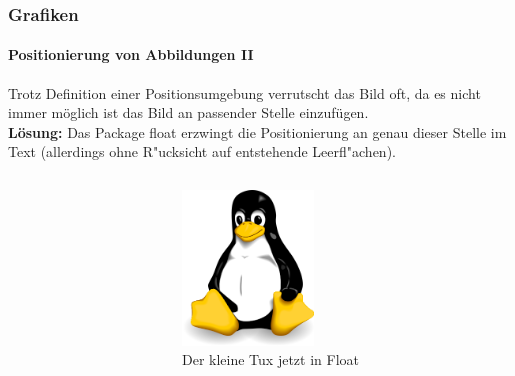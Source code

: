 
\begin{frame}[t]
\medskip
\frametitle{Grafiken}
\framesubtitle{Positionierung von Abbildungen II }
Trotz Definition einer Positionsumgebung verrutscht das Bild oft, da es nicht immer m\"oglich ist das Bild an passender Stelle einzufügen.\\
\textbf{L\"osung:} Das Package {\ttfamily float} erzwingt die Positionierung an genau dieser Stelle im Text (allerdings ohne R"ucksicht auf entstehende Leerfl"achen).

\begin{columns}
\begin{column}{.5\textwidth}
{\ttfamily {\footnotesize
}}
\end{column}

\begin{column}{.5\textwidth} 
\begin{figure}
\begin{center}
    \includegraphics[width=35mm]{image/tux.png}
\caption{Der kleine Tux jetzt in Float}
\label{img:kleinertux_float}
\end{center}
\end{figure}
\end{column}
\end{columns}

\end{frame}
